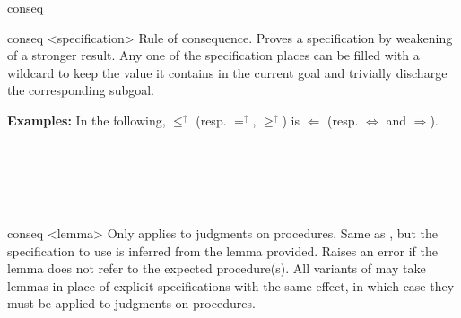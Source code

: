 \begin{tactic}{conseq}
  \begin{tsyntax}{conseq <specification>}
  Rule of consequence. Proves a specification by weakening of a
  stronger result. Any one of the specification places can be filled
  with a wildcard \tct{_} to keep the value it contains in the current
  goal and trivially discharge the corresponding subgoal.

  \textbf{Examples:} In the following, $\leq^\uparrow$ (resp. $=^\uparrow$,
  $\geq^\uparrow$) is $\Leftarrow$ (resp. $\Leftrightarrow$ and
  $\Rightarrow$).
  \begin{mathpar}
    {}%
    \quad{} \\
    {}%
    \quad{} \\
    {}%
    \quad{} \\
    {}%
    \quad{} \\
  \end{mathpar}
  \end{tsyntax}

  \begin{tsyntax}{conseq <lemma>}
  Only applies to judgments on procedures. Same as , but the specification to use is inferred from
  the lemma provided. Raises an error if the lemma does not refer to
  the expected procedure(s). All variants of  may take
  lemmas in place of explicit specifications with the same effect, in
  which case they must be applied to judgments on procedures.
  \end{tsyntax}


\end{tactic}
